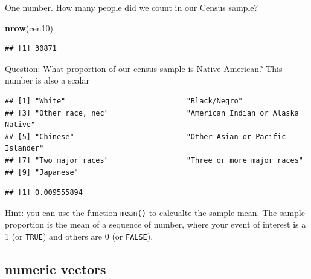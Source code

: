 \documentclass[]{book}
\newenvironment{Shaded}{\begin{snugshade}}{\end{snugshade}}
\newcommand{\KeywordTok}[1]{\textcolor[rgb]{0.13,0.29,0.53}{\textbf{#1}}}
\newcommand{\StringTok}[1]{\textcolor[rgb]{0.31,0.60,0.02}{#1}}
\newcommand{\CommentTok}[1]{\textcolor[rgb]{0.56,0.35,0.01}{\textit{#1}}}
\newcommand{\OperatorTok}[1]{\textcolor[rgb]{0.81,0.36,0.00}{\textbf{#1}}}
\newcommand{\NormalTok}[1]{#1}
\theoremstyle{definition}
\theoremstyle{definition}
\theoremstyle{definition}
\theoremstyle{remark}
\begin{document}
One number. How many people did we count in our Census sample?

\begin{Shaded}
\begin{Highlighting}[]
\KeywordTok{nrow}\NormalTok{(cen10)}
\end{Highlighting}
\end{Shaded}

\begin{verbatim}
## [1] 30871
\end{verbatim}

Question: What proportion of our census sample is Native American? This
number is also a scalar

\begin{Shaded}
\end{Shaded}

\begin{verbatim}
## [1] "White"                            "Black/Negro"                     
## [3] "Other race, nec"                  "American Indian or Alaska Native"
## [5] "Chinese"                          "Other Asian or Pacific Islander" 
## [7] "Two major races"                  "Three or more major races"       
## [9] "Japanese"
\end{verbatim}

\begin{Shaded}
\end{Shaded}

\begin{verbatim}
## [1] 0.009555894
\end{verbatim}

Hint: you can use the function \texttt{mean()} to calcualte the sample
mean. The sample proportion is the mean of a sequence of number, where
your event of interest is a 1 (or \texttt{TRUE}) and others are 0 (or
\texttt{FALSE}).

\subsection{numeric vectors}\label{numeric-vectors}
\end{document}
